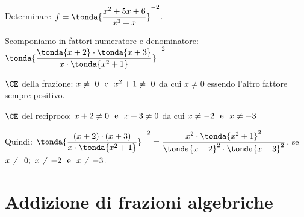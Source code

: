  \begin{esempio}
Determinare~\(f = \tonda{\dfrac{x^{2}+5x+6}{x^{3}+x}} ^{-2}\).
\begin{itemize*}
 \item Scomponiamo in fattori numeratore e 
  denominatore:~\( \tonda{\dfrac{ \tonda{x+2} \cdot  \tonda{x+3} }
                            {x\cdot  \tonda{x^{2}+1} }} ^{-2}\)
 \item \(\CE\) della frazione: \(x\neq~0 \text{~~e~~} x^2+1\neq~0\) da cui
\(x \neq 0\) essendo l'altro fattore sempre positivo.
 \item \(\CE\) del reciproco: \(x+2 \neq 0 \text{~~e~~} x+3 \neq 0\) da cui 
\(x \neq -2 \text{~~e~~} x \neq -3\)
\end{itemize*}
Quindi:
\(\tonda{\dfrac{(x+2)\cdot (x+3)}{x\cdot  \tonda{x^2+1} }}^{-2}=
  \dfrac{x^2 \cdot \tonda{x^2+1}^2}{\tonda{x+2}^{2} \cdot \tonda{x+3}^2}\),
\quad se~\(x \neq~0;~x \neq -2 \text{~~e~~} x\neq-3\).
 \end{esempio}


\section{Addizione di frazioni algebriche}
\label{sec:frazalg_addizione}


